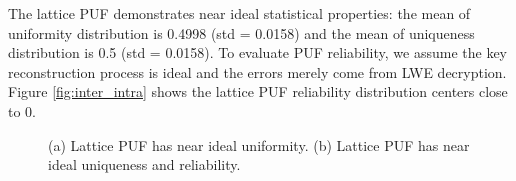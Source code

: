 The lattice PUF demonstrates near ideal statistical properties: the mean of uniformity distribution is 0.4998 (std = 0.0158) and the mean of uniqueness distribution is 0.5 (std = 0.0158). 
To evaluate PUF reliability, we assume the key reconstruction process is ideal and the errors merely come from LWE decryption. 
Figure \ref{fig:inter_intra} shows the lattice PUF reliability distribution centers close to 0. 





\begin{figure} 
    \centering
    \hfill
  \caption{(a) Lattice PUF has near ideal uniformity. (b) Lattice PUF has near ideal uniqueness and reliability.}
  \label{fig: lattice_puf_stats} 
\end{figure}

